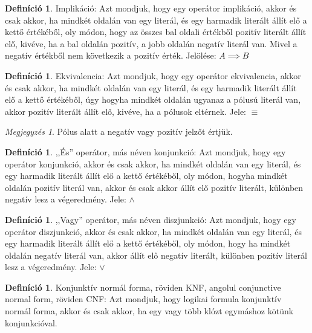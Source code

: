 \documentclass[
]{thesis-ekf}
\theoremstyle{definition}
\newtheorem{definicio}[tetel]{Definíció}
\theoremstyle{remark}
\newtheorem{megjegyzes}[tetel]{Megjegyzés}
\begin{document}
	\begin{definicio}
		Implikáció: Azt mondjuk, hogy egy operátor implikáció, akkor és csak akkor, ha mindkét oldalán van egy literál, és egy harmadik literált állít elő a kettő értékéből, oly módon, hogy az összes bal oldali értékből pozitív literált állít elő, kivéve, ha a bal oldalán pozitív, a jobb oldalán negatív literál van.
		Mivel a negatív értékből nem következik a pozitív érték. Jelölése: $ A \implies B $
	\end{definicio}

	\begin{definicio}
		Ekvivalencia: Azt mondjuk, hogy egy operátor ekvivalencia, akkor és csak akkor, ha mindkét oldalán van egy literál, és egy harmadik literált állít elő a kettő értékéből, úgy hogyha mindkét oldalán ugyanaz a pólusú literál van, akkor pozitív literált állít elő, kivéve, ha a pólusok eltérnek. Jele: $ \equiv $
	\end{definicio}

	\begin{megjegyzes}
		Pólus alatt a negatív vagy pozitív jelzőt értjük.
	\end{megjegyzes}

	\begin{definicio}
		,,És'' operátor, más néven konjunkció: Azt mondjuk, hogy egy operátor konjunkció, akkor és csak akkor, ha mindkét oldalán van egy literál, és egy harmadik literált állít elő a kettő értékéből, oly módon, hogyha mindkét oldalán pozitív literál van, akkor és csak akkor állít elő pozitív literált, különben negatív lesz a végeredmény. Jele: $\wedge$
	\end{definicio}

	\begin{definicio}
		,,Vagy'' operátor, más néven diszjunkció: Azt mondjuk, hogy egy operátor diszjunkció, akkor és csak akkor, ha mindkét oldalán van egy literál, és egy harmadik literált állít elő a kettő értékéből, oly módon, hogy ha mindkét oldalán negatív literál van, akkor állít elő negatív literált, különben pozitív literál lesz a végeredmény. Jele: $\vee$
	\end{definicio}

	\begin{definicio}\label{def-cnf}
		Konjunktív normál forma, röviden \textsc{KNF}, angolul conjunctive normal form, röviden \textsc{CNF}: Azt mondjuk, hogy logikai formula konjunktív normál forma, akkor és csak akkor, ha egy vagy több klózt egymáshoz kötünk konjunkcióval.
	\end{definicio}
\end{document}
